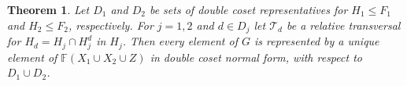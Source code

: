 \documentclass[a4paper,12pt]{article}
\newtheorem{theorem}{Theorem}[section]
\numberwithin{equation}{section}
\numberwithin{figure}{section}
\newcommand{\FF}{\ensuremath{\mathbb{F}}}
\newcommand{\cT}{\mathcal{T}}
\begin{document}

\begin{theorem}\label{thm:dcnf} Let $D_1$ and $D_2$ be sets of  double coset representatives for
$H_1\le F_1$ and $H_2\le F_2$, respectively.  For $j=1,2$ and $d\in D_j$ let 
$\cT_d$ be a relative transversal for $H_d=H_j\cap H_j^d$ in $H_j$. 
Then every element of $G$ is represented by a unique element of
$\FF(X_1\cup X_2\cup Z)$ in double coset normal form, with respect
to $D_1\cup D_2$.
\end{theorem}
\end{document}
